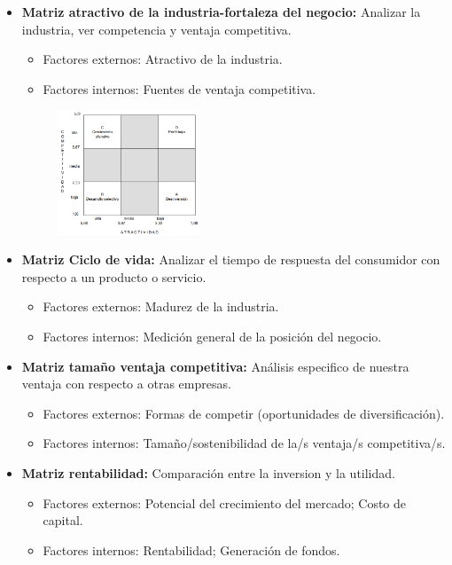 \documentclass{templateNote}
\begin{document}
\begin{itemize}
\begin{itemize}
\begin{itemize}
            \end{itemize}
            \item \textbf{Matriz atractivo de la industria-fortaleza del negocio:} Analizar la industria, ver competencia y ventaja competitiva.
            \begin{itemize}
                \item Factores externos: Atractivo de la industria.
                \item Factores internos: Fuentes de ventaja competitiva.
            \end{itemize}
            \begin{figure}[H]
                \centering
                \includegraphics[width=0.4\textwidth]{img/matriz_atractivo.png}
            \end{figure}
            \item \textbf{Matriz Ciclo de vida:} Analizar el tiempo de respuesta del consumidor con respecto a un producto o servicio.
            \begin{itemize}
                \item Factores externos: Madurez de la industria.
                \item Factores internos: Medición general de la posición del negocio.
            \end{itemize}
            \item \textbf{Matriz tamaño ventaja competitiva:} Análisis especifico de nuestra ventaja con respecto a otras empresas.
            \begin{itemize}
                \item Factores externos: Formas de competir (oportunidades de diversificación).
                \item Factores internos: Tamaño/sostenibilidad de la/s ventaja/s competitiva/s.
            \end{itemize}
            \item \textbf{Matriz rentabilidad:} Comparación entre la inversion y la utilidad. 
            \begin{itemize}
                \item Factores externos: Potencial del crecimiento del mercado; Costo de capital.
                \item Factores internos: Rentabilidad; Generación de fondos.
            \end{itemize}
        \end{itemize}
    \end{itemize}
\end{document}
